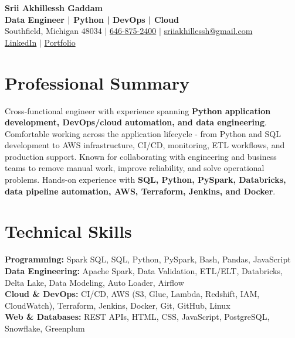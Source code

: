 \documentclass[letterpaper,10pt]{article}
\begin{document}
\fontsize{9.35pt}{10.45pt}\selectfont

\begin{center}
    {\LARGE \textbf{Srii Akhillessh Gaddam}} \\[-1pt]
    \textbf{Data Engineer | Python | DevOps | Cloud} \\[2pt]
    Southfield, Michigan 48034 $|$
    \href{tel:6468752400}{646-875-2400} $|$
    \href{mailto:sriiakhillessh@gmail.com}{sriiakhillessh@gmail.com} \\[1pt]
    \href{https://www.linkedin.com/in/srii-akhiilessh-gaddam-b48668191/}{LinkedIn} $|$
    \href{https://sriiakhillesshg.github.io/portfolio/}{Portfolio}
\end{center}
\vspace{-8pt}

\section{Professional Summary}
\small{Cross-functional engineer with experience spanning \textbf{Python application development, DevOps/cloud automation, and data engineering}. Comfortable working across the application lifecycle - from Python and SQL development to AWS infrastructure, CI/CD, monitoring, ETL workflows, and production support. Known for collaborating with engineering and business teams to remove manual work, improve reliability, and solve operational problems. Hands-on experience with \textbf{SQL, Python, PySpark, Databricks, data pipeline automation, AWS, Terraform, Jenkins, and Docker}.}

\section{Technical Skills}
\small{
\textbf{Programming:} Spark SQL, SQL, Python, PySpark, Bash, Pandas, JavaScript \\
\textbf{Data Engineering:} Apache Spark, Data Validation, ETL/ELT, Databricks, Delta Lake, Data Modeling, Auto Loader, Airflow \\
\textbf{Cloud \& DevOps:} CI/CD, AWS (S3, Glue, Lambda, Redshift, IAM, CloudWatch), Terraform, Jenkins, Docker, Git, GitHub, Linux \\
\textbf{Web \& Databases:} REST APIs, HTML, CSS, JavaScript, PostgreSQL, Snowflake, Greenplum
}

\end{document}
